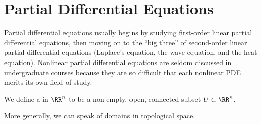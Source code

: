 \chapter{Partial Differential Equations}

\begin{node}\label{pde-0000}%
Partial differential equations usually begins by studying first-order
linear partial differential equations, then moving on to the ``big
three'' of second-order linear partial differential equations (Laplace's
equation, the wave equation, and the heat equation). Nonlinear partial
differential equations are seldom discussed in undergraduate courses
because they are so difficult that each nonlinear PDE merits its own
field of study.
\end{node}

\begin{definition}\label{pde-0001}%
We define a  in $\RR^{n}$ to be a non-empty, open,
connected subset $U\subset\RR^{n}$.

More generally, we can speak of domains in topological space.
\end{definition}

